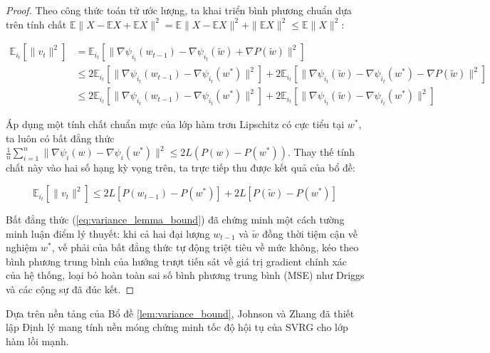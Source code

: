 \begin{proof}

Theo công thức toán tử ước lượng, ta khai triển bình phương chuẩn dựa trên tính chất $\mathbb{E}\|X - \mathbb{E}X + \mathbb{E}X\|^2 = \mathbb{E}\|X - \mathbb{E}X\|^2 + \|\mathbb{E}X\|^2 \le \mathbb{E}\|X\|^2$:

\begin{align}
\mathbb{E}_{i_t} \left[ \|v_t\|^2 \right] &= \mathbb{E}_{i_t} \left[ \|\nabla \psi_{i_t}(w_{t-1}) - \nabla \psi_{i_t}(\tilde{w}) + \nabla P(\tilde{w})\|^2 \right] \\
&\le 2 \mathbb{E}_{i_t} \left[ \|\nabla \psi_{i_t}(w_{t-1}) - \nabla \psi_{i_t}(w^*)\|^2 \right] + 2 \mathbb{E}_{i_t} \left[ \|\nabla \psi_{i_t}(\tilde{w}) - \nabla \psi_{i_t}(w^*) - \nabla P(\tilde{w})\|^2 \right] \nonumber \\
&\le 2 \mathbb{E}_{i_t} \left[ \|\nabla \psi_{i_t}(w_{t-1}) - \nabla \psi_{i_t}(w^*)\|^2 \right] + 2 \mathbb{E}_{i_t} \left[ \|\nabla \psi_{i_t}(\tilde{w}) - \nabla \psi_{i_t}(w^*)\|^2 \right]
\end{align}

Áp dụng một tính chất chuẩn mực của lớp hàm trơn Lipschitz có cực tiểu tại $w^*$, ta luôn có bất đẳng thức $\frac{1}{n}\sum_{i=1}^n \|\nabla \psi_i(w) - \nabla \psi_i(w^*)\|^2 \le 2L(P(w) - P(w^*))$. Thay thế tính chất này vào hai số hạng kỳ vọng trên, ta trực tiếp thu được kết quả của bổ đề:

\begin{equation}
\mathbb{E}_{i_t} \left[ \|v_t\|^2 \right] \le 2L \left[ P(w_{t-1}) - P(w^*) \right] + 2L \left[ P(\tilde{w}) - P(w^*) \right]
\end{equation}

Bất đẳng thức (\ref{eq:variance_lemma_bound}) đã chứng minh một cách tường minh luận điểm lý thuyết: khi cả hai đại lượng $w_{t-1}$ và $\tilde{w}$ đồng thời tiệm cận về nghiệm $w^*$, vế phải của bất đẳng thức tự động triệt tiêu về mức không, kéo theo bình phương trung bình của hướng trượt tiến sát về giá trị gradient chính xác của hệ thống, loại bỏ hoàn toàn sai số bình phương trung bình (MSE) như Driggs và các cộng sự \cite{driggs2022accelerating} đã đúc kết.
\end{proof}


Dựa trên nền tảng của Bổ đề \ref{lem:variance_bound}, Johnson và Zhang \cite{johnson2013accelerating} đã thiết lập Định lý mang tính nền móng chứng minh tốc độ hội tụ của SVRG cho lớp hàm lồi mạnh.


